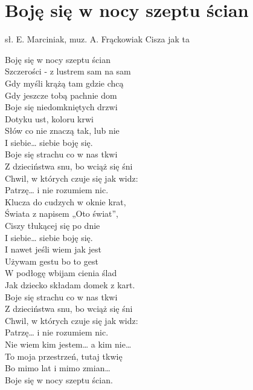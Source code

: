 \section{Boję się w nocy szeptu ścian}
{sł. E. Marciniak, muz. A. Frąckowiak}
{Cisza jak ta}
\begin{text}

Boję się w nocy szeptu ścian\\
Szczerości - z lustrem sam na sam\\
Gdy myśli krążą tam gdzie chcą\\
Gdy jeszcze tobą pachnie dom\\

Boje się niedomkniętych drzwi\\
Dotyku ust, koloru krwi\\
Słów co nie znaczą tak, lub nie\\
I siebie… siebie boję się.\\

Boje się strachu co w nas tkwi\\
Z dzieciństwa snu, bo wciąż się śni\\
Chwil, w których czuje się jak widz:\\
Patrzę… i nie rozumiem nic.\\

Klucza do cudzych w oknie krat,\\
Świata z napisem „Oto świat”,\\
Ciszy tłukącej się po dnie\\
I siebie… siebie boję się.\\

I nawet jeśli wiem jak jest\\
Używam gestu bo to gest\\
W podłogę wbijam cienia ślad\\
Jak dziecko składam domek z kart.\\

Boje się strachu co w nas tkwi\\
Z dzieciństwa snu, bo wciąż się śni\\
Chwil, w których czuje się jak widz:\\
Patrzę… i nie rozumiem nic.\\

Nie wiem kim jestem… a kim nie…\\
To moja przestrzeń, tutaj tkwię\\
Bo mimo lat i mimo zmian…\\
Boje się w nocy szeptu ścian.\\
\end{text}
\begin{chord}
\end{chord}
